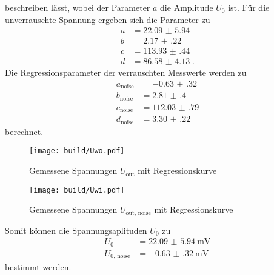 beschreiben lässt, wobei der Parameter $a$ die Amplitude $U_0$ ist.
Für die unverrauschte Spannung ergeben sich die Parameter zu    
\begin{align*}
    a &= \num{22.09(594)}       \\
    b &= \num{2.17(22)}         \\
    c &= \num{113.93(44)}       \\
    d &= \num{86.58(413)} \; \text{.}
\end{align*}
Die Regressionsparameter der verrauschten Messwerte werden zu
\begin{align*}
    a_\text{noise} &= \num{-0.63(32)} \\           
    b_\text{noise} &= \num{2.81(40)}  \\            
    c_\text{noise} &= \num{112.03(79)}\\
    d_\text{noise} &= \num{3.30(22)}
\end{align*}
berechnet.
\begin{figure}
    \centering
    \caption{Gemessene Spannungen $U_\text{out}$ mit Regressionskurve}
    \label{fig:Uwo}
    \texttt{[image: build/Uwo.pdf]}
\end{figure}
\begin{figure}
    \centering
    \caption{Gemessene Spannungen $U_\text{out, noise}$ mit Regressionskurve}
    \label{fig:Uwi}
    \texttt{[image: build/Uwi.pdf]}
\end{figure}
Somit können die Spannungsaplituden $U_0$ zu 
\begin{align*}
    U_0                 & = \SI{22.09(594)}{\milli\volt} \\
    U_{0 \text{, noise}}& = \SI{-0.63(32)}{\milli\volt}
\end{align*}
bestimmt werden.
